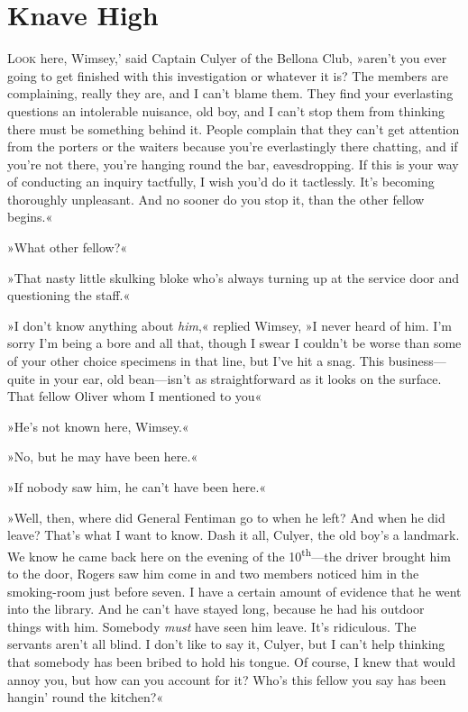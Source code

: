 \chapter{Knave High}

\lettrine[lines=4,ante=‘]{L}{ook} here, Wimsey,' said Captain Culyer of the Bellona Club, »aren't you ever going to get finished with this investigation or whatever it is? The members are complaining, really they are, and I can't blame them. They find your everlasting questions an intolerable nuisance, old boy, and I can't stop them from thinking there must be something behind it. People complain that they can't get attention from the porters or the waiters because you're everlastingly there chatting, and if you're not there, you're hanging round the bar, eavesdropping. If this is your way of conducting an inquiry tactfully, I wish you'd do it tactlessly. It's becoming thoroughly unpleasant. And no sooner do you stop it, than the other fellow begins.«

»What other fellow?«

»That nasty little skulking bloke who's always turning up at the service door and questioning the staff.«

»I don't know anything about \textit{him},« replied Wimsey, »I never heard of him. I'm sorry I'm being a bore and all that, though I swear I couldn't be worse than some of your other choice specimens in that line, but I've hit a snag. This business—quite in your ear, old bean—isn't as straightforward as it looks on the surface. That fellow Oliver whom I mentioned to you\longdash«

»He's not known here, Wimsey.«

»No, but he may have been here.«

»If nobody saw him, he can't have been here.«

»Well, then, where did General Fentiman go to when he left? And when he did leave? That's what I want to know. Dash it all, Culyer, the old boy's a landmark. We know he came back here on the evening of the  10\textsuperscript{th}—the driver brought him to the door, Rogers saw him come in and two members noticed him in the smoking-room just before seven. I have a certain amount of evidence that he went into the library. And he can't have stayed long, because he had his outdoor things with him. Somebody \textit{must} have seen him leave. It's ridiculous. The servants aren't all blind. I don't like to say it, Culyer, but I can't help thinking that somebody has been bribed to hold his tongue\textellipsis. Of course, I knew that would annoy you, but how can you account for it? Who's this fellow you say has been hangin' round the kitchen?«

